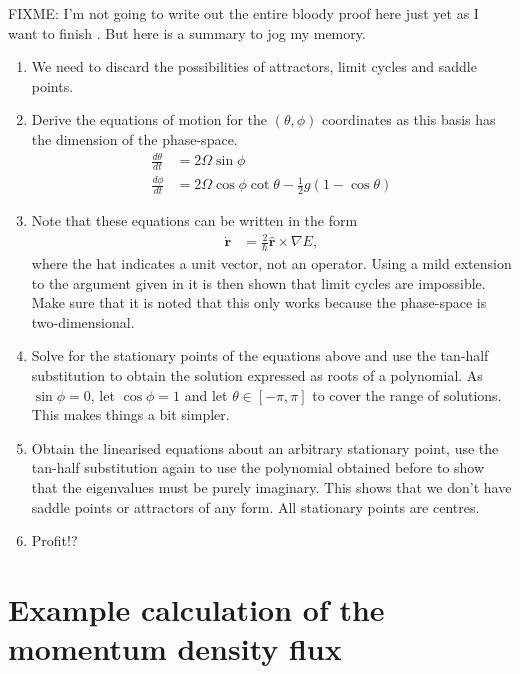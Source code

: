 FIXME: I'm not going to write out the entire bloody proof here just yet as I want to finish . But here is a summary to jog my memory.
\begin{enumerate}
    \item We need to discard the possibilities of attractors, limit cycles and saddle points.
    \item Derive the equations of motion for the $(\theta, \phi)$ coordinates as this basis has the dimension of the phase-space.
    \begin{align}
        \frac{d \theta}{dt} &= 2 \Omega \sin\phi\\
        \frac{d \phi}{dt} &= 2 \Omega \cos\phi \cot\theta - \frac{1}{2} g (1-\cos\theta)
    \end{align}
    \item Note that these equations can be written in the form
    \begin{align}
        \dot{\bm{r}} &= \frac{2}{\hbar} \hat{\bm{r}} \times \nabla E,
    \end{align}
    where the hat indicates a unit vector, not an operator. Using a mild extension to the argument given in \citep[Theorem 1.14]{Ye-Yan-qian:1984} it is then shown that limit cycles are impossible. Make sure that it is noted that this only works because the phase-space is two-dimensional.
    \item Solve for the stationary points of the equations above and use the tan-half substitution to obtain the solution expressed as roots of a polynomial. As $\sin\phi=0$, let $\cos\phi=1$ and let $\theta \in [-\pi, \pi]$ to cover the range of solutions. This makes things a bit simpler.
    \item Obtain the linearised equations about an arbitrary stationary point, use the tan-half substitution again to use the polynomial obtained before to show that the eigenvalues must be purely imaginary. This shows that we don't have saddle points or attractors of any form. All stationary points are centres.
    \item Profit!?
\end{enumerate}


\section{Example calculation of the momentum density flux}
\label{MethodsAppendix:MomentumDensityFluxExampleCalculation}

